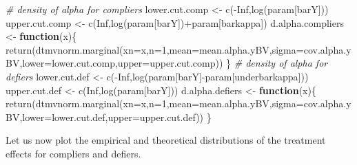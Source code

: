 \documentclass[
]{book}
\newenvironment{Shaded}{\begin{snugshade}}{\end{snugshade}}
\newcommand{\AttributeTok}[1]{\textcolor[rgb]{0.77,0.63,0.00}{#1}}
\newcommand{\CommentTok}[1]{\textcolor[rgb]{0.56,0.35,0.01}{\textit{#1}}}
\newcommand{\ConstantTok}[1]{\textcolor[rgb]{0.00,0.00,0.00}{#1}}
\newcommand{\ControlFlowTok}[1]{\textcolor[rgb]{0.13,0.29,0.53}{\textbf{#1}}}
\newcommand{\DecValTok}[1]{\textcolor[rgb]{0.00,0.00,0.81}{#1}}
\newcommand{\FunctionTok}[1]{\textcolor[rgb]{0.00,0.00,0.00}{#1}}
\newcommand{\NormalTok}[1]{#1}
\newcommand{\OtherTok}[1]{\textcolor[rgb]{0.56,0.35,0.01}{#1}}
\newcommand{\SpecialCharTok}[1]{\textcolor[rgb]{0.00,0.00,0.00}{#1}}
\newcommand{\StringTok}[1]{\textcolor[rgb]{0.31,0.60,0.02}{#1}}
\theoremstyle{definition}
\theoremstyle{definition}
\theoremstyle{definition}
\theoremstyle{definition}
\theoremstyle{remark}
\begin{document}
\begin{Shaded}
\begin{Highlighting}[]
\CommentTok{\# density of alpha for compliers}
\NormalTok{lower.cut.comp }\OtherTok{\textless{}{-}} \FunctionTok{c}\NormalTok{(}\SpecialCharTok{{-}}\ConstantTok{Inf}\NormalTok{,}\FunctionTok{log}\NormalTok{(param[}\StringTok{\textquotesingle{}barY\textquotesingle{}}\NormalTok{]))}
\NormalTok{upper.cut.comp }\OtherTok{\textless{}{-}} \FunctionTok{c}\NormalTok{(}\ConstantTok{Inf}\NormalTok{,}\FunctionTok{log}\NormalTok{(param[}\StringTok{\textquotesingle{}barY\textquotesingle{}}\NormalTok{])}\SpecialCharTok{+}\NormalTok{param[}\StringTok{\textquotesingle{}barkappa\textquotesingle{}}\NormalTok{])}
\NormalTok{d.alpha.compliers }\OtherTok{\textless{}{-}} \ControlFlowTok{function}\NormalTok{(x)\{}
  \FunctionTok{return}\NormalTok{(}\FunctionTok{dtmvnorm.marginal}\NormalTok{(}\AttributeTok{xn=}\NormalTok{x,}\AttributeTok{n=}\DecValTok{1}\NormalTok{,}\AttributeTok{mean=}\NormalTok{mean.alpha.yBV,}\AttributeTok{sigma=}\NormalTok{cov.alpha.yBV,}\AttributeTok{lower=}\NormalTok{lower.cut.comp,}\AttributeTok{upper=}\NormalTok{upper.cut.comp))}
\NormalTok{\}}
\CommentTok{\# density of alpha for defiers}
\NormalTok{lower.cut.def }\OtherTok{\textless{}{-}} \FunctionTok{c}\NormalTok{(}\SpecialCharTok{{-}}\ConstantTok{Inf}\NormalTok{,}\FunctionTok{log}\NormalTok{(param[}\StringTok{\textquotesingle{}barY\textquotesingle{}}\NormalTok{]}\SpecialCharTok{{-}}\NormalTok{param[}\StringTok{\textquotesingle{}underbarkappa\textquotesingle{}}\NormalTok{]))}
\NormalTok{upper.cut.def }\OtherTok{\textless{}{-}} \FunctionTok{c}\NormalTok{(}\ConstantTok{Inf}\NormalTok{,}\FunctionTok{log}\NormalTok{(param[}\StringTok{\textquotesingle{}barY\textquotesingle{}}\NormalTok{]))}
\NormalTok{d.alpha.defiers }\OtherTok{\textless{}{-}} \ControlFlowTok{function}\NormalTok{(x)\{}
  \FunctionTok{return}\NormalTok{(}\FunctionTok{dtmvnorm.marginal}\NormalTok{(}\AttributeTok{xn=}\NormalTok{x,}\AttributeTok{n=}\DecValTok{1}\NormalTok{,}\AttributeTok{mean=}\NormalTok{mean.alpha.yBV,}\AttributeTok{sigma=}\NormalTok{cov.alpha.yBV,}\AttributeTok{lower=}\NormalTok{lower.cut.def,}\AttributeTok{upper=}\NormalTok{upper.cut.def))}
\NormalTok{\}}
\end{Highlighting}
\end{Shaded}

Let us now plot the empirical and theoretical distributions of the treatment effects for compliers and defiers.
\end{document}
